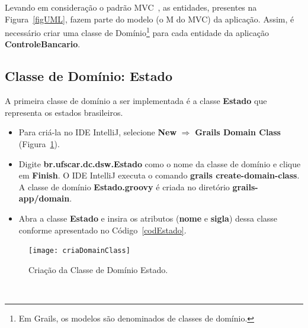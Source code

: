 Levando  em consideração o  padrão MVC~\cite{KP88},  as entidades,  presentes na
Figura~\ref{figUML}, fazem parte do modelo (o  M do MVC) da aplicação.  Assim, é
necessário  criar  uma classe  de  Domínio\footnote{Em  Grails,  os modelos  são
  denominados  de classes  de domínio.}   para cada  entidade da  aplicação {\bf
  ControleBancario}.  

\subsection{Classe de Domínio: Estado}\label{secEstado}

\vspace{0.5cm}

A primeira  classe de  domínio a ser  implementada é  a classe {\bf  Estado} que
representa os estados brasileiros.

\begin{itemize}

\item Para criá-la  no IDE IntelliJ, selecione {\bf  New} $\Longrightarrow$ {\bf
  Grails Domain Class} (Figura~\ref{novoEstadoFig}). 

\vspace{0.5cm}

\item Digite  {\bf br.ufscar.dc.dsw.Estado} como o  nome da classe  de domínio e
  clique  em  {\bf  Finish}.  O  IDE  IntelliJ  executa  o comando  {\bf  grails
    create-domain-class}. A  classe de domínio  {\bf Estado.groovy} é  criada no
  diretório {\bf grails-app/domain}.  
 
\vspace{0.5cm}

\item  Abra a  classe {\bf  Estado} e  insira os  atributos ({\bf  nome}  e {\bf
  sigla}) dessa classe conforme apresentado no Código~\ref{codEstado}. 

\end{itemize}

\begin{figure}[htbp]
\centering\texttt{[image: criaDomainClass]}
\caption{Criação da Classe de Domínio Estado.}
\label{novoEstadoFig}
\end{figure}

\hspace{1cm}\\

